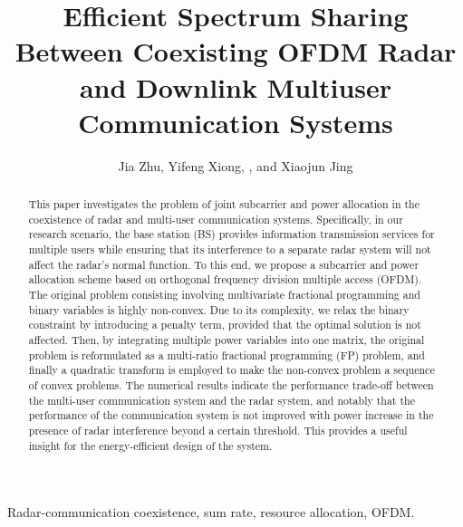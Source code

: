 \documentclass[a4paper,journal,10pt]{IEEEtran}
\begin{document}
	
\title{\LARGE Efficient Spectrum Sharing Between Coexisting OFDM Radar and Downlink Multiuser Communication Systems}	
\author{Jia Zhu, Yifeng Xiong, , and Xiaojun Jing}
\markboth{}{}	

\maketitle	
\begin{abstract}
This paper investigates the problem of joint subcarrier and power allocation in the coexistence of radar and multi-user communication systems. Specifically, in our research scenario, the base station (BS) provides information transmission services for multiple users while ensuring that its interference to a separate radar system will not affect the radar's normal function. To this end, we propose a subcarrier and power allocation scheme based on orthogonal frequency division multiple access (OFDM). 
The original problem consisting involving multivariate fractional programming and binary variables is highly non-convex. 
Due to its complexity, we relax the binary constraint by introducing a penalty term, provided that the optimal solution is not affected. Then, by integrating multiple power variables into one matrix, the original problem is reformulated as a multi-ratio fractional programming (FP) problem, and finally a quadratic transform is employed to make the non-convex problem a sequence of convex problems. The numerical results indicate the performance trade-off between the multi-user communication system and the radar system, and notably that the performance of the communication system is not improved with power increase in the presence of radar interference beyond a certain threshold. 
This provides a useful insight for the energy-efficient design of the system.
\end{abstract}
	
\begin{IEEEkeywords}
	Radar-communication coexistence, sum rate, resource allocation, OFDM.
\end{IEEEkeywords}	
\end{document}
